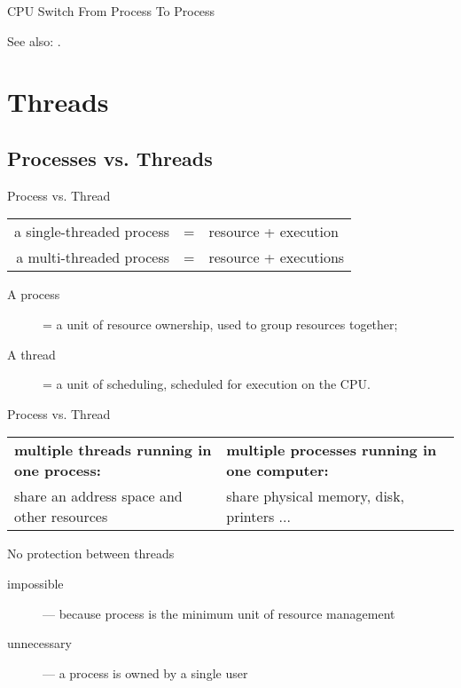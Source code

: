 \begin{frame}{CPU Switch From Process To Process}
  \mode<beamer>{\centering\texttt{[image: cpu-switch]} }%
\end{frame}

See also: .


\section{Threads}
\label{sec:threads}

\subsection{Processes vs. Threads}
\label{sec:proc-vs.-thre}

\begin{frame}{Process vs. Thread}
    \begin{tabular}{rcl}
      a single-threaded process&=&resource + execution\\
      a  multi-threaded process&=&resource + executions\\
    \end{tabular}
    \begin{center}
    \end{center}
  \begin{description}
  \item[A process] = a unit of resource ownership, used to group resources together;
  \item[A thread] = a unit of scheduling, scheduled for execution on the CPU.
  \end{description}  
\end{frame}

\begin{frame}{Process vs. Thread}
  \begin{center}
    \begin{tabularx}{.9\textwidth}{X|X}
      \textbf{multiple threads running in one process:}&
      \textbf{multiple processes running in one computer:}\\
      share an address space and other resources&
      share physical memory, disk, printers ...\\
    \end{tabularx}
  \end{center}
  \begin{block}{No protection between threads}
    \begin{description}
    \item[impossible] --- because process is the minimum unit of resource management
    \item[unnecessary] --- a process is owned by a single user
    \end{description}    
  \end{block}
\end{frame}

